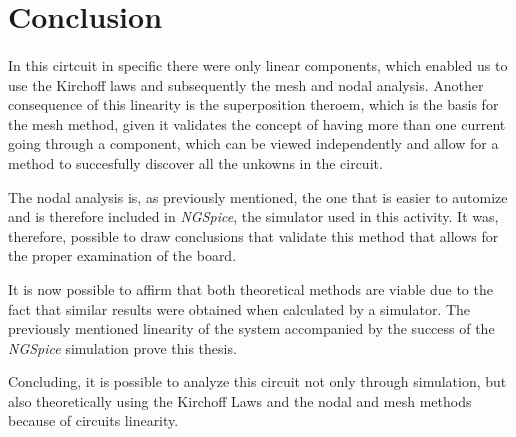 \section{Conclusion}
\label{sec:conclusion}
\paragraph{}
\par In this cirtcuit in specific there were only linear components, which enabled us to use the Kirchoff laws and subsequently the mesh and nodal analysis. Another consequence of this linearity is the superposition theroem, which is the basis for the mesh method, given it validates the concept of having more than one current going through a component, which can be viewed independently and allow for a method to succesfully discover all the unkowns in the circuit.
\par The nodal analysis is, as previously mentioned, the one that is easier to automize and is therefore included in \textit{NGSpice}, the simulator used in this activity. It was, therefore, possible to draw conclusions that validate this method that allows for the proper examination of the board.
\par It is now possible to affirm that both theoretical methods are viable due to the fact that similar results were obtained when calculated by a simulator. The previously mentioned linearity of the system accompanied by the success of the \textit{NGSpice} simulation prove this thesis.
\par Concluding, it is possible to analyze this circuit not only through simulation, but also theoretically using the Kirchoff Laws and the nodal and mesh methods because of circuits linearity.
